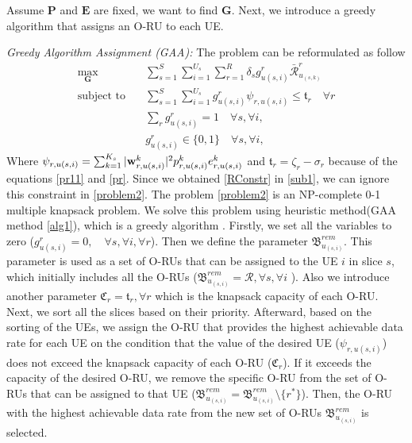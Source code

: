 \documentclass[lettersize,journal]{IEEEtran}
\begin{document}
Assume $\boldsymbol{P}$ and $\boldsymbol{E}$ are fixed, we want to find $\boldsymbol{G}$.
Next, we introduce a greedy algorithm that assigns an O-RU to each UE.

\textit{Greedy Algorithm Assignment (GAA):}
The problem can be reformulated as follow
\begin{subequations}\label{problem2}
\begin{alignat}{4}
\max\limits_{ \boldsymbol{G} }   \quad &  \sum_{s=1}^S\sum_{i=1}^{U_s}\sum_{r=1}^{R} \delta_s g^r_{u(s,i)}\bar{\mathcal{R}}^r_{u_{(s,k)}} \ \\
\text{subject to} \quad  & \sum_{s=1}^{S}\sum_{i=1}^{U_s} g_{u(s,i)}^r \psi_{r,u(s,i)}\leq \mathfrak{t}_r \quad \forall r
 \label{p11} \\
& \sum_{r}g^r_{u(s,i)} = 1  \quad \forall s,\forall i, \label{p12}\\
 & g^r_{u(s,i)} \in \{0,1\} \quad \forall s,\forall i, \label{p13}
\end{alignat}
\end{subequations}
Where $ \psi_{r,u(s,i)}=\sum_{k=1}^{K_s}|\bold{w}_{r,u(s,i)}^{k}|^2 p_{r,u(s,i)}^{k}  e^k_{r,u(s,i)}$
and $\mathfrak{t}_r = \zeta_r- \sigma_r$  because of the equations \eqref{pr11} and \eqref{pr}.
Since we obtained \eqref{RConstr} in \eqref{sub1}, we can ignore this constraint in \eqref{problem2}.
The problem \eqref{problem2} is an NP-complete 0-1 multiple knapsack problem.
We solve this problem using heuristic method(GAA method \ref{alg1}), which is a greedy algorithm \cite{akccay2007greedy,lee2018dynamic}.
Firstly, we set all the variables to zero ($g^r_{u(s,i)} = 0, \quad \forall s, \forall i, \forall r$).
Then we define the parameter ${\mathfrak{B}}^{rem}_{u_{(s,i)}}$. This parameter is used as a set of O-RUs that can be assigned to the UE $i$ in slice $s$, which initially includes all the O-RUs (${\mathfrak{B}}^{rem}_{u_{(s,i)}} = \mathcal{R}, \forall s, \forall i$ ).
Also we introduce another parameter $ \mathfrak{C}_r = \mathfrak{t}_r, \forall r$
which is the knapsack capacity of each O-RU.
Next, we sort all the slices based on their priority.
Afterward, based on the sorting of the UEs,
we assign the O-RU that provides the highest achievable data rate for each UE on the condition that the value of the desired UE ($\psi_{r,u(s,i)}$) does not exceed the knapsack capacity of each O-RU ($ \mathfrak{C}_r$).
If it exceeds the capacity of the desired O-RU, we remove the specific O-RU from the set of O-RUs that can be assigned to that UE (${\mathfrak{B}}^{rem}_{u_{(s,i)}} = {\mathfrak{B}}^{rem}_{u_{(s,i)}} \setminus \{{r^*}\} $). Then, the O-RU with the highest achievable data rate from the new set of O-RUs ${\mathfrak{B}}^{rem}_{u_{(s,i)}}$ is selected.
\end{document}
